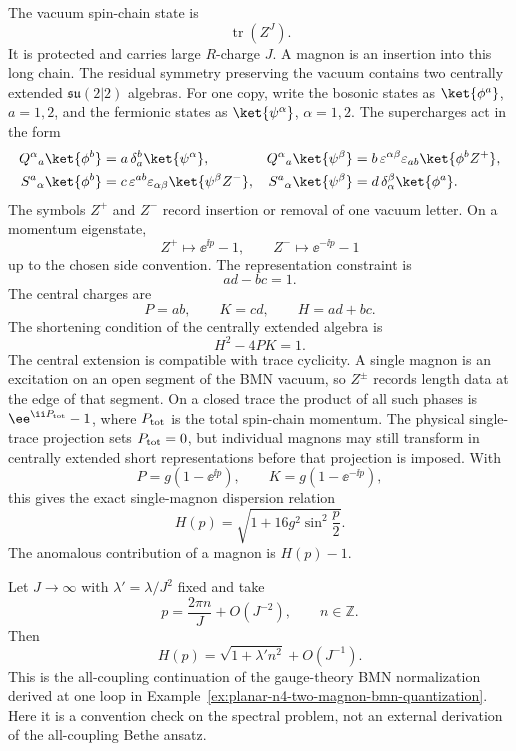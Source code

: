 The vacuum spin-chain state is
\[
  \operatorname{tr}(Z^J).
\]
It is protected and carries large \(R\)-charge \(J\).  A magnon is an
insertion into this long chain.  The residual symmetry preserving the vacuum
contains two centrally extended \(\mathfrak{su}(2|2)\) algebras.  For one
copy, write the bosonic states as \(\ket{\phi^a}\), \(a=1,2\), and the
fermionic states as \(\ket{\psi^\alpha}\), \(\alpha=1,2\).  The supercharges
act in the form
\[
\begin{aligned}
  Q^\alpha{}_a\ket{\phi^b}
  &=a\,\delta_a^b\ket{\psi^\alpha},
&
  Q^\alpha{}_a\ket{\psi^\beta}
  &=b\,\varepsilon^{\alpha\beta}\varepsilon_{ab}\ket{\phi^b Z^+},
\\
  S^a{}_\alpha\ket{\phi^b}
  &=c\,\varepsilon^{ab}\varepsilon_{\alpha\beta}\ket{\psi^\beta Z^-},
&
  S^a{}_\alpha\ket{\psi^\beta}
  &=d\,\delta_\alpha^\beta\ket{\phi^a}.
\end{aligned}
\]
The symbols \(Z^+\) and \(Z^-\) record insertion or removal of one vacuum
letter.  On a momentum eigenstate,
\[
  Z^+\mapsto \ee^{\ii p}-1,
  \qquad
  Z^-\mapsto \ee^{-\ii p}-1
\]
up to the chosen side convention.  The representation constraint is
\[
  ad-bc=1.
\]
The central charges are
\[
  P=ab,\qquad K=cd,\qquad H=ad+bc .
\]
The shortening condition of the centrally extended algebra is
\[
  H^2-4PK=1 .
\]
The central extension is compatible with trace cyclicity.  A single magnon is
an excitation on an open segment of the BMN vacuum, so \(Z^\pm\) records
length data at the edge of that segment.  On a closed trace the product of
all such phases is \(\ee^{\ii P_{\rm tot}}-1\), where \(P_{\rm tot}\) is the
total spin-chain momentum.  The physical single-trace projection sets
\(P_{\rm tot}=0\), but individual magnons may still transform in centrally
extended short representations before that projection is imposed.
With
\[
  P=g(1-\ee^{\ii p}),\qquad K=g(1-\ee^{-\ii p}),
\]
this gives the exact single-magnon dispersion relation
\begin{equation}
  H(p)=\sqrt{1+16g^2\sin^2\frac p2}.
  \label{eq:planar-n4-magnon-dispersion}
\end{equation}
The anomalous contribution of a magnon is \(H(p)-1\).

\begin{controlledapproximation}
\label{ca:planar-n4-bmn-scaling-check}
Let \(J\to\infty\) with \(\lambda'=\lambda/J^2\) fixed and take
\[
  p=\frac{2\pi n}{J}+O(J^{-2}),\qquad n\in\mathbb Z .
\]
Then
\[
  H(p)=\sqrt{1+\lambda' n^2}+O(J^{-1}).
\]
This is the all-coupling continuation of the gauge-theory BMN normalization
derived at one loop in
Example~\ref{ex:planar-n4-two-magnon-bmn-quantization}.  Here it is a
convention check on the spectral problem, not an external derivation of the
all-coupling Bethe ansatz.
\end{controlledapproximation}

